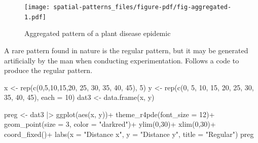 \documentclass[
  letterpaper,
]{book}
\newenvironment{Shaded}{\begin{snugshade}}{\end{snugshade}}
\newcommand{\AttributeTok}[1]{\textcolor[rgb]{0.40,0.45,0.13}{#1}}
\newcommand{\DecValTok}[1]{\textcolor[rgb]{0.68,0.00,0.00}{#1}}
\newcommand{\FunctionTok}[1]{\textcolor[rgb]{0.28,0.35,0.67}{#1}}
\newcommand{\NormalTok}[1]{\textcolor[rgb]{0.00,0.23,0.31}{#1}}
\newcommand{\OtherTok}[1]{\textcolor[rgb]{0.00,0.23,0.31}{#1}}
\newcommand{\SpecialCharTok}[1]{\textcolor[rgb]{0.37,0.37,0.37}{#1}}
\newcommand{\StringTok}[1]{\textcolor[rgb]{0.13,0.47,0.30}{#1}}
\begin{document}
\begin{figure}[H]

{\centering \texttt{[image: spatial-patterns\_files/figure-pdf/fig-aggregated-1.pdf]}

}

\caption{\label{fig-aggregated}Aggregated pattern of a plant disease
epidemic}

\end{figure}

A rare pattern found in nature is the regular pattern, but it may be
generated artificially by the man when conducting experimentation.
Follows a code to produce the regular pattern.

\begin{Shaded}
\begin{Highlighting}[]
\NormalTok{x }\OtherTok{\textless{}{-}} \FunctionTok{rep}\NormalTok{(}\FunctionTok{c}\NormalTok{(}\DecValTok{0}\NormalTok{,}\DecValTok{5}\NormalTok{,}\DecValTok{10}\NormalTok{,}\DecValTok{15}\NormalTok{,}\DecValTok{20}\NormalTok{, }\DecValTok{25}\NormalTok{, }\DecValTok{30}\NormalTok{, }\DecValTok{35}\NormalTok{, }\DecValTok{40}\NormalTok{, }\DecValTok{45}\NormalTok{), }\DecValTok{5}\NormalTok{) }
\NormalTok{y }\OtherTok{\textless{}{-}} \FunctionTok{rep}\NormalTok{(}\FunctionTok{c}\NormalTok{(}\DecValTok{0}\NormalTok{, }\DecValTok{5}\NormalTok{, }\DecValTok{10}\NormalTok{, }\DecValTok{15}\NormalTok{, }\DecValTok{20}\NormalTok{, }\DecValTok{25}\NormalTok{, }\DecValTok{30}\NormalTok{, }\DecValTok{35}\NormalTok{, }\DecValTok{40}\NormalTok{, }\DecValTok{45}\NormalTok{), }\AttributeTok{each =} \DecValTok{10}\NormalTok{)}
\NormalTok{dat3 }\OtherTok{\textless{}{-}} \FunctionTok{data.frame}\NormalTok{(x, y)}

\NormalTok{preg }\OtherTok{\textless{}{-}}\NormalTok{ dat3 }\SpecialCharTok{|\textgreater{}}
  \FunctionTok{ggplot}\NormalTok{(}\FunctionTok{aes}\NormalTok{(x, y))}\SpecialCharTok{+}
  \FunctionTok{theme\_r4pde}\NormalTok{(}\AttributeTok{font\_size =} \DecValTok{12}\NormalTok{)}\SpecialCharTok{+}
  \FunctionTok{geom\_point}\NormalTok{(}\AttributeTok{size =} \DecValTok{3}\NormalTok{, }\AttributeTok{color =} \StringTok{"darkred"}\NormalTok{)}\SpecialCharTok{+}
  \FunctionTok{ylim}\NormalTok{(}\DecValTok{0}\NormalTok{,}\DecValTok{30}\NormalTok{)}\SpecialCharTok{+}
  \FunctionTok{xlim}\NormalTok{(}\DecValTok{0}\NormalTok{,}\DecValTok{30}\NormalTok{)}\SpecialCharTok{+}
  \FunctionTok{coord\_fixed}\NormalTok{()}\SpecialCharTok{+}
  \FunctionTok{labs}\NormalTok{(}\AttributeTok{x =} \StringTok{"Distance x"}\NormalTok{, }\AttributeTok{y =} \StringTok{"Distance y"}\NormalTok{, }
       \AttributeTok{title =} \StringTok{"Regular"}\NormalTok{)}
\NormalTok{preg}
\end{Highlighting}
\end{Shaded}
\end{document}
